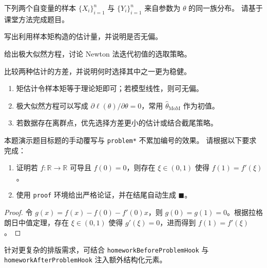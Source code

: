 \documentclass[lang=zh,problemstyle=boxed,theme=color,captionstyle=compact,subnumbering,tightlists,mathdelims,statmacros,localizedate]{homework}
\begin{document}
\begin{problem}[矩估计与极大似然]
    下列两个自变量的样本 $\{X_i\}_{i=1}^n$ 与 $\{Y_i\}_{i=1}^n$ 来自参数为 $\theta$ 的同一族分布。
    请基于课堂方法完成题目。

    \begin{subproblem}
        写出利用样本矩构造的估计量，并说明是否无偏。
    \end{subproblem}
    \begin{subproblem}
        给出极大似然方程，讨论 Newton 法迭代初值的选取策略。
    \end{subproblem}
    \begin{subproblem*}[补充讨论]
        比较两种估计的方差，并说明何时选择其中之一更为稳健。
    \end{subproblem*}

    \solution

    \begin{enumerate}
        \item 矩估计令样本矩等于理论矩即可；若模型线性，则可无偏。
        \item 极大似然方程可以写成 $\partial\ell(\theta)/\partial\theta=0$，常用 $\hat\theta_{\mathrm{MoM}}$ 作为初值。
        \item 若数据存在离群点，优先选择方差更小的估计或结合截尾策略。
    \end{enumerate}
\end{problem}

\pagebreak

\begin{problem*}
    本题演示题目标题的手动覆写与 \verb|problem*| 不累加编号的效果。
    请根据以下要求完成：
    \begin{enumerate}
        \item 证明若 $f\colon \mathbb{R}\to\mathbb{R}$ 可导且 $f(0)=0$，则存在 $\xi\in(0,1)$ 使得
            $f(1)=f'(\xi)$。
        \item 使用 \verb|proof| 环境给出严格论证，并在结尾自动生成 $\blacksquare$。
    \end{enumerate}

    \solution

    \begin{proof}
        令 $g(x)=f(x)-f(0)-f'(0)x$，则 $g(0)=g(1)=0$。根据拉格朗日中值定理，存在
        $\xi\in(0,1)$ 使得 $g'(\xi)=0$，进而得到 $f(1)=f'(\xi)$。
    \end{proof}

    \begin{note}
        针对更复杂的排版需求，可结合 \verb|homeworkBeforeProblemHook| 与
        \verb|homeworkAfterProblemHook| 注入额外结构化元素。
    \end{note}
\end{problem*}
\end{document}
